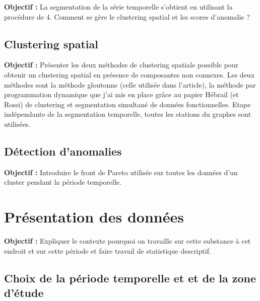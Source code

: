 \documentclass[12pt, twoside]{report}
\begin{document}
\textbf{Objectif :} La segmentation de la série temporelle s'obtient en utilisant la procédure de 4. Comment se gère le clustering spatial et les scores d'anomalie ? 



\subsection{Clustering spatial}

\textbf{Objectif :} Présenter les deux méthodes de clustering spatiale possible pour obtenir un clustering spatial en présence de composantes non connexes. Les deux méthodes sont la méthode gloutonne (celle utilisée dans l'article), la méthode par programmation dynamique que j'ai mis en place grâce au papier Hébrail (et Rossi) de clustering et segmentation simultané de données fonctionnelles. Etape indépendante de la segmentation temporelle, toutes les stations du graphes sont utilisées. 

\subsection{Détection d'anomalies}

\textbf{Objectif :} Introduire le front de Pareto utilisée sur toutes les données d'un cluster pendant la période temporelle. 

\section{Présentation des données}

\textbf{Objectif :} Expliquer le contexte pourquoi on travaille sur cette substance à cet endroit et sur cette période et faire travail de statistique descriptif. 

\subsection{Choix de la période temporelle et et de la zone d'étude}
\end{document}
